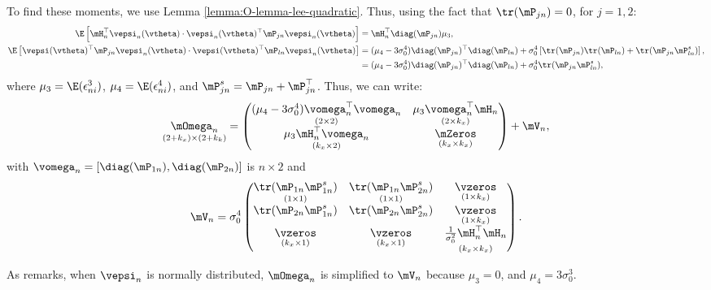 To find these moments, we use Lemma \ref{lemma:O-lemma-lee-quadratic}. Thus, using the fact that $\tr(\mP_{jn}) = 0$, for $j = 1, 2$: 
\begin{equation*}
\begin{aligned}
\E\left[\mH_n^\top\vepsi_n(\vtheta) \cdot \vepsi_n(\vtheta)^\top\mP_{jn}\vepsi_n(\vtheta)\right] & = \mH_n^\top\diag(\mP_{jn})\mu_3, \\
\E\left[\vepsi(\vtheta)^\top\mP_{jn}\vepsi_n(\vtheta) \cdot \vepsi(\vtheta)^\top\mP_{ln}\vepsi_n(\vtheta)\right]& = (\mu_4 - 3\sigma^4_0)\diag(\mP_{jn})^\top\diag(\mP_{ln}) + \sigma^4_0\left[\tr(\mP_{jn})\tr(\mP_{ln}) + \tr(\mP_{jn}\mP_{ln}^s)\right], \\
& = (\mu_4 - 3\sigma^4_0)\diag(\mP_{jn})^\top\diag(\mP_{ln}) + \sigma^4_0\tr(\mP_{jn}\mP_{ln}^s), \\
\end{aligned}
\end{equation*}
%
where $\mu_3 = \E(\epsilon_{ni}^3)$,  $\mu_4 = \E(\epsilon_{ni}^4)$, and $\mP_{jn}^s = \mP_{jn} + \mP_{jn}^\top$. Thus, we can write:
\begin{equation*}
\underset{(2 + k_x) \times (2 + k_k)}{\mOmega_n} = \begin{pmatrix}
              \underset{(2 \times 2)}{(\mu_4 - 3\sigma_0^4)\vomega_n^\top\vomega_n} & \underset{(2 \times k_x)}{\mu_3\vomega^\top_n\mH_n} \\
              \underset{(k_x \times 2)}{\mu_3 \mH_n^\top\vomega_n} & \underset{(k_x \times k_x)}{\mZeros} 
            \end{pmatrix}
             + 
             \mV_n,
\end{equation*}
%
with $\vomega_n = \left[\diag(\mP_{1n}), \diag(\mP_{2n})\right]$ is $n\times 2$ and 
\begin{equation*}
  \mV_n = \sigma_0^4
          \begin{pmatrix}
          \underset{(1\times 1)}{\tr(\mP_{1n}\mP_{1n}^s)} & \underset{(1\times 1)}{\tr(\mP_{1n}\mP_{2n}^s)} & \underset{(1\times k_x)}{\vzeros} \\
          \tr(\mP_{2n}\mP_{1n}^s) & \tr(\mP_{2n}\mP_{2n}^s) & \underset{(1\times k_x)}{\vzeros} \\
          \underset{(k_x\times 1)}{\vzeros} & \underset{(k_x\times 1)}{\vzeros} & \underset{(k_x\times k_x)}{\frac{1}{\sigma_0^2}\mH_n^\top\mH_n}
          \end{pmatrix}.
\end{equation*}

As \cite{lee2007gmm} remarks, when $\vepsi_n$ is normally distributed, $\mOmega_n$ is simplified to $\mV_n$ because $\mu_3 = 0$, and $\mu_4 = 3\sigma_0^3$.

